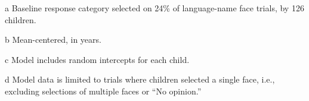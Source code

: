 \begin{table}[ht]
\begin{threeparttable}
\begin{tabular}{lllrllllr}
\end{tabular}
\begin{tablenotes}[flushleft]
    \item[a] Baseline response category selected on 24\% of language-name face trials, by 126 children. %
    \item[b] Mean-centered, in years.
    \item[c] Model includes random intercepts for each child.
    \item[d] Model data is limited to trials where children selected a single face, i.e., excluding selections of multiple faces or ``No opinion.'' 
\end{tablenotes}
\end{threeparttable}
\end{table}
